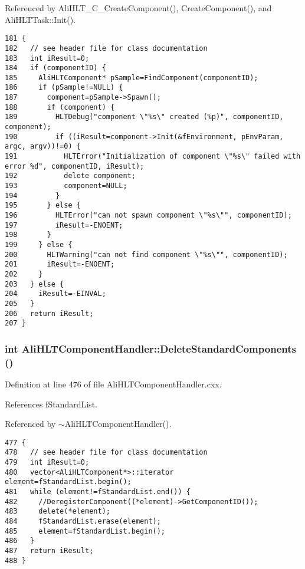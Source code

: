 Referenced by Ali\-HLT\_\-C\_\-Create\-Component(), Create\-Component(), and Ali\-HLTTask::Init().

\footnotesize\begin{verbatim}181 {
182   // see header file for class documentation
183   int iResult=0;
184   if (componentID) {
185     AliHLTComponent* pSample=FindComponent(componentID);
186     if (pSample!=NULL) {
187       component=pSample->Spawn();
188       if (component) {
189         HLTDebug("component \"%s\" created (%p)", componentID, component);
190         if ((iResult=component->Init(&fEnvironment, pEnvParam, argc, argv))!=0) {
191           HLTError("Initialization of component \"%s\" failed with error %d", componentID, iResult);
192           delete component;
193           component=NULL;
194         }
195       } else {
196         HLTError("can not spawn component \"%s\"", componentID);
197         iResult=-ENOENT;
198       }
199     } else {
200       HLTWarning("can not find component \"%s\"", componentID);
201       iResult=-ENOENT;
202     }
203   } else {
204     iResult=-EINVAL;
205   }
206   return iResult;
207 }
\end{verbatim}\normalsize 


\subsubsection{\setlength{\rightskip}{0pt plus 5cm}int Ali\-HLTComponent\-Handler::Delete\-Standard\-Components ()}\label{classAliHLTComponentHandler_a14}




Definition at line 476 of file Ali\-HLTComponent\-Handler.cxx.

References f\-Standard\-List.

Referenced by $\sim$Ali\-HLTComponent\-Handler().

\footnotesize\begin{verbatim}477 {
478   // see header file for class documentation
479   int iResult=0;
480   vector<AliHLTComponent*>::iterator element=fStandardList.begin();
481   while (element!=fStandardList.end()) {
482     //DeregisterComponent((*element)->GetComponentID());
483     delete(*element);
484     fStandardList.erase(element);
485     element=fStandardList.begin();
486   }
487   return iResult;
488 }
\end{verbatim}\normalsize 


